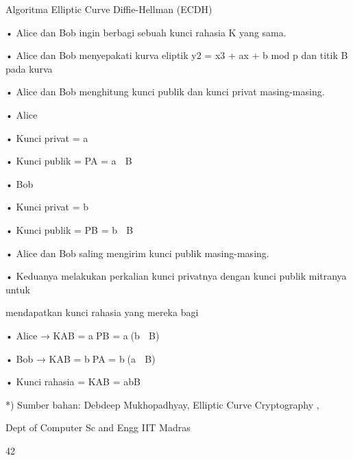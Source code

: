 \documentclass{article}
\begin{document}

Algoritma Elliptic Curve Diffie-Hellman  (ECDH)

• Alice dan Bob ingin berbagi sebuah kunci rahasia K yang sama.

• Alice dan Bob menyepakati kurva eliptik y2 = x3 + ax + b  mod p dan titik B pada kurva

• Alice dan Bob menghitung kunci publik dan kunci privat masing-masing. 

• Alice

• Kunci privat = a

• Kunci publik = PA = a  B

• Bob

• Kunci privat = b

• Kunci publik = PB = b  B

• Alice dan Bob saling mengirim kunci publik masing-masing.

• Keduanya melakukan perkalian kunci privatnya dengan kunci publik mitranya untuk 

mendapatkan kunci rahasia yang mereka bagi

• Alice → KAB = aPB = a(b  B)

• Bob  → KAB = bPA = b(a  B)

• Kunci rahasia = KAB = abB

*) Sumber bahan: Debdeep Mukhopadhyay, Elliptic Curve Cryptography ,

 Dept of Computer Sc and Engg IIT Madras

42
\end{document}
